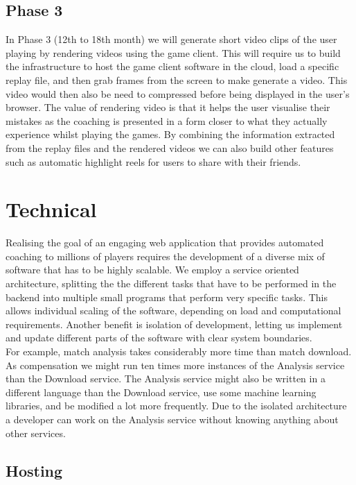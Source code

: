 \documentclass[12pt]{report} %
\begin{document}
\subsection{Phase 3}

In Phase 3 (12th to 18th month) we will generate short video clips of the user playing by rendering videos using the game client. This will require us to build the infrastructure to host the game client software in the cloud, load a specific replay file, and then grab frames from the screen to make generate a video. This video would then also be need to compressed before being displayed in the user's browser. The value of rendering video is that it helps the user visualise their mistakes as the coaching is presented in a form closer to what they actually experience whilst playing the games. By combining the information extracted from the replay files and the rendered videos we can also build other features such as automatic highlight reels for users to share with their friends.

\section{Technical}

Realising the goal of an engaging web application that provides automated coaching to millions of players requires the development of a diverse mix of software that has to be highly scalable. We employ a service oriented architecture, splitting the the different tasks that have to be performed in the backend into multiple small programs that perform very specific tasks. This allows individual scaling of the software, depending on load and computational requirements. Another benefit is isolation of development, letting us implement and update different parts of the software with clear system boundaries.\\

For example, match analysis takes considerably more time than match download. As compensation we might run ten times more instances of the Analysis service than the Download service. The Analysis service might also be written in a different language than the Download service, use some machine learning libraries, and be modified a lot more frequently. Due to the isolated architecture a developer can work on the Analysis service without knowing anything about other services.

\subsection{Hosting}
\end{document}

